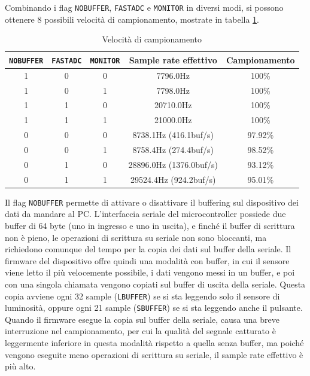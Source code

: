 Combinando i flag \texttt{NOBUFFER}, \texttt{FASTADC} e \texttt{MONITOR} in diversi modi, si possono ottenere 8 possibili velocità di campionamento, mostrate in tabella \ref{tab:openldat_samplerates}.
\begin{table}[h!]
	\centering
	\begin{tabular}{|c|c|c|c|c|} 
		\hline
		\texttt{NOBUFFER} & \texttt{FASTADC} & \texttt{MONITOR} & \textbf{Sample rate effettivo} & \textbf{Campionamento}   \\ 
		\hline
		1 & 0 & 0 & 7796.0Hz & 100\%         \\
		\hline
		1 & 0 & 1 & 7798.0Hz & 100\%         \\
		\hline
		1 & 1 & 0 & 20710.0Hz & 100\%         \\
		\hline
		1 & 1 & 1 & 21000.0Hz & 100\%         \\ 
		\hline
		0 & 0 & 0 & 8738.1Hz (416.1buf/s) & 97.92\%         \\
		\hline
		0 & 0 & 1 & 8758.4Hz (274.4buf/s) & 98.52\%         \\
		\hline
		0 & 1 & 0 & 28896.0Hz (1376.0buf/s) & 93.12\%         \\
		\hline
		0 & 1 & 1 & 29524.4Hz (924.2buf/s) & 95.01\%         \\
		\hline
	\end{tabular}
	\caption{\label{tab:openldat_samplerates}Velocità di campionamento}
\end{table}

Il flag \texttt{NOBUFFER} permette di attivare o disattivare il buffering sul dispositivo dei dati da mandare al PC. L'interfaccia seriale del microcontroller possiede due buffer di 64 byte (uno in ingresso e uno in uscita), e finché il buffer di scrittura non è pieno, le operazioni di scrittura su seriale non sono bloccanti, ma richiedono comunque del tempo per la copia dei dati sul buffer della seriale. Il firmware del dispositivo offre quindi una modalità con buffer, in cui il sensore viene letto il più velocemente possibile, i dati vengono messi in un buffer, e poi con una singola chiamata vengono copiati sul buffer di uscita della seriale. Questa copia avviene ogni 32 sample (\texttt{LBUFFER}) se si sta leggendo solo il sensore di luminosità, oppure ogni 21 sample (\texttt{SBUFFER}) se si sta leggendo anche il pulsante. Quando il firmware esegue la copia sul buffer della seriale, causa una breve interruzione nel campionamento, per cui la qualità del segnale catturato è leggermente inferiore in questa modalità rispetto a quella senza buffer, ma poiché vengono eseguite meno operazioni di scrittura su seriale, il sample rate effettivo è più alto.

